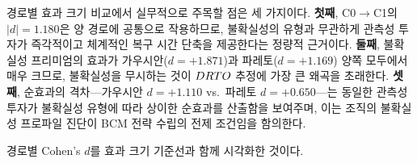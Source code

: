 경로별 효과 크기 비교에서 실무적으로 주목할 점은 세 가지이다.
\textbf{첫째}, C0$\to$C1의 $|d| = 1.180$은 양 경로에 공통으로 작용하므로,
불확실성의 유형과 무관하게 관측성 투자가 즉각적이고 체계적인
복구 시간 단축을 제공한다는 정량적 근거이다.
\textbf{둘째}, 불확실성 프리미엄의 효과가 가우시안($d = +1.871$)과
파레토($d = +1.169$) 양쪽 모두에서 매우 크므로, 불확실성을 무시하는 것이
$DRTO$ 추정에 가장 큰 왜곡을 초래한다.
\textbf{셋째}, 순효과의 격차---가우시안 $d = +1.110$ vs.\ 파레토 $d = +0.650$---는
동일한 관측성 투자가 불확실성 유형에 따라 상이한 순효과를 산출함을 보여주며,
이는 조직의 불확실성 프로파일 진단이 BCM 전략 수립의 전제 조건임을 함의한다.

 경로별 Cohen's $d$를
효과 크기 기준선과 함께 시각화한 것이다.

